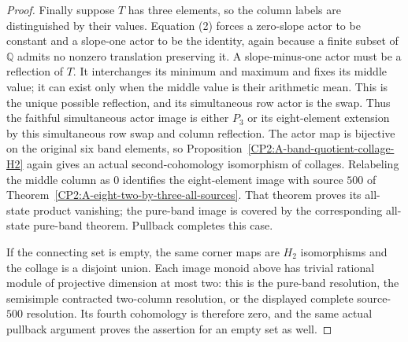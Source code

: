 \begin{proof}
Finally suppose $T$ has three elements, so the column
labels are distinguished by their values.  Equation (2)
forces a zero-slope actor to be constant and a slope-one
actor to be the identity, again because a finite subset
of $\mathbb Q$ admits no nonzero translation preserving it.
A slope-minus-one actor must be a reflection of $T$.
It interchanges its minimum and maximum and fixes its
middle value; it can exist only when the middle value
is their arithmetic mean.  This is the unique possible
reflection, and its simultaneous row actor is the swap.
Thus the faithful simultaneous actor image is either
$P_3$ or its eight-element extension by this simultaneous
row swap and column reflection.
The actor map is bijective on the original six band
elements, so Proposition~\ref{CP2:A-band-quotient-collage-H2}
again gives an actual second-cohomology isomorphism of
collages.  Relabeling the middle column as $0$ identifies
the eight-element image with source $500$ of
Theorem~\ref{CP2:A-eight-two-by-three-all-sources}.
That theorem proves its all-state product vanishing;
the pure-band image is covered by the corresponding
all-state pure-band theorem.  Pullback completes this case.

If the connecting set is empty, the same corner maps
are $H_2$ isomorphisms and the collage is a disjoint
union.  Each image monoid above has trivial rational
module of projective dimension at most two: this is
the pure-band resolution, the semisimple contracted
two-column resolution, or the displayed complete
source-$500$ resolution.  Its fourth cohomology is
therefore zero, and the same actual pullback argument
proves the assertion for an empty set as well.
\end{proof}
